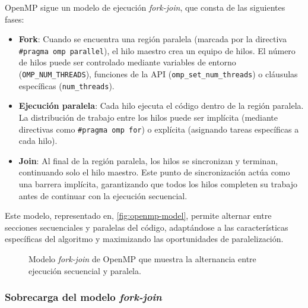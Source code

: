             OpenMP sigue un modelo de ejecución \textit{fork-join}, que consta de las siguientes fases:
            
            \begin{itemize}
            
                \item \textbf{Fork}: Cuando se encuentra una región paralela (marcada por la directiva \texttt{\#pragma omp parallel}), el hilo maestro crea un equipo de hilos. El número de hilos puede ser controlado mediante variables de entorno (\texttt{OMP\_NUM\_THREADS}), funciones de la API (\texttt{omp\_set\_num\_threads}) o cláusulas específicas (\texttt{num\_threads}).
                
                \item \textbf{Ejecución paralela}: Cada hilo ejecuta el código dentro de la región paralela. La distribución de trabajo entre los hilos puede ser implícita (mediante directivas como \texttt{\#pragma omp for}) o explícita (asignando tareas específicas a cada hilo).
                
                \item \textbf{Join}: Al final de la región paralela, los hilos se sincronizan y terminan, continuando solo el hilo maestro. Este punto de sincronización actúa como una barrera implícita, garantizando que todos los hilos completen su trabajo antes de continuar con la ejecución secuencial.
                
            \end{itemize}
            
            Este modelo, representado en, \autoref{fig:openmp-model}, permite alternar entre secciones secuenciales y paralelas del código, adaptándose a las características específicas del algoritmo y maximizando las oportunidades de paralelización.

            \begin{figure}[H]
                \centering
                \caption{Modelo \textit{fork-join} de OpenMP que muestra la alternancia entre ejecución secuencial y paralela.}
                \label{fig:openmp-model}
            \end{figure}

        \subsubsection{Sobrecarga del modelo \textit{fork-join}}

